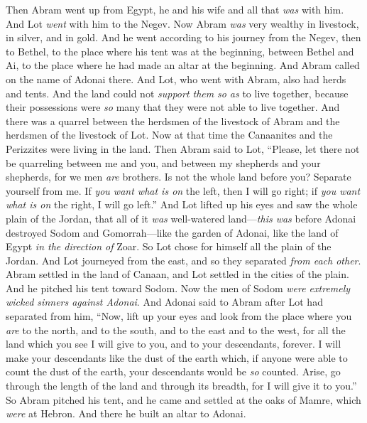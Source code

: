 \begin{biblechapter} %
 Then Abram went up from Egypt, he and his wife and all that \textit{was} with him. And Lot \textit{went} with him to the Negev.
\verse Now Abram \textit{was} very wealthy in livestock, in silver, and in gold.
\verse And he went according to his journey from the Negev, then to Bethel, to the place where his tent was at the beginning, between Bethel and Ai,
\verse to the place where he had made an altar at the beginning. And Abram called on the name of Adonai there.
\verse And Lot, who went with Abram, also had herds and tents.
\verse And the land could not \textit{support them} \textit{so as} to live together, because their possessions were \textit{so} many that they were not able to live together.
\verse And there was a quarrel between the herdsmen of the livestock of Abram and the herdsmen of the livestock of Lot. Now at that time the Canaanites and the Perizzites were living in the land.
\verse Then Abram said to Lot, “Please, let there not be quarreling between me and you, and between my shepherds and your shepherds, for we men \textit{are} brothers.
\verse Is not the whole land before you? Separate yourself from me. If \textit{you want what is on} the left, then I will go right; if \textit{you want what is on} the right, I will go left.”
\verse And Lot lifted up his eyes and saw the whole plain of the Jordan, that all of it \textit{was} well-watered land—\textit{this was} before Adonai destroyed Sodom and Gomorrah—like the garden of Adonai, like the land of Egypt \textit{in the direction of} Zoar.
\verse So Lot chose for himself all the plain of the Jordan. And Lot journeyed from the east, and so they separated \textit{from each other}.
\verse Abram settled in the land of Canaan, and Lot settled in the cities of the plain. And he pitched his tent toward Sodom.
\verse Now the men of Sodom \textit{were extremely wicked sinners against Adonai}.
\verse And Adonai said to Abram after Lot had separated from him, “Now, lift up your eyes and look from the place where you \textit{are} to the north, and to the south, and to the east and to the west,
\verse for all the land which you see I will give to you, and to your descendants, forever.
\verse I will make your descendants like the dust of the earth which, if anyone were able to count the dust of the earth, your descendants would be \textit{so} counted.
\verse Arise, go through the length of the land and through its breadth, for I will give it to you.”
\verse So Abram pitched his tent, and he came and settled at the oaks of Mamre, which \textit{were} at Hebron. And there he built an altar to Adonai.
\end{biblechapter}

